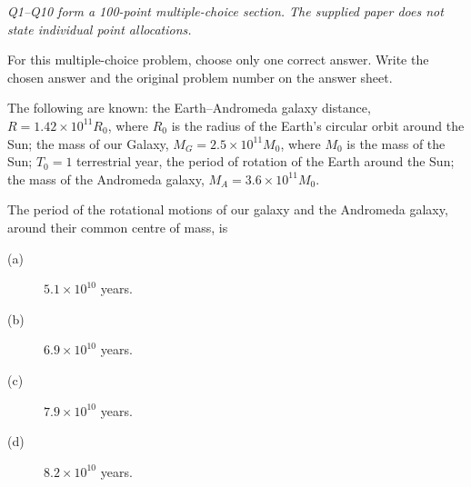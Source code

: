 \textit{Q1--Q10 form a 100-point multiple-choice section. The supplied paper
does not state individual point allocations.}

For this multiple-choice problem, choose only one correct answer. Write the
chosen answer and the original problem number on the answer sheet.

The following are known: the Earth--Andromeda galaxy distance,
$R=1.42\times10^{11}R_0$, where $R_0$ is the radius of the Earth's circular
orbit around the Sun; the mass of our Galaxy, $M_G=2.5\times10^{11}M_0$,
where $M_0$ is the mass of the Sun; $T_0=1$ terrestrial year, the period of
rotation of the Earth around the Sun; the mass of the Andromeda galaxy,
$M_A=3.6\times10^{11}M_0$.

The period of the rotational motions of our galaxy and the Andromeda galaxy,
around their common centre of mass, is
\begin{description}
\item[(a)] $5.1\times10^{10}$ years.
\item[(b)] $6.9\times10^{10}$ years.
\item[(c)] $7.9\times10^{10}$ years.
\item[(d)] $8.2\times10^{10}$ years.
\end{description}
